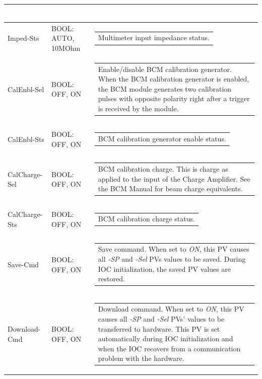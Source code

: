 \documentclass[openany]{article}
\begin{document}
\begin{longtable}{| m{3.0cm} m{4.5cm} m{7.0cm} |}
\begin{tabular}{@{}m{6cm}@{}}
						\end{tabular} \\ \hline
		Imped-Sts & BOOL: AUTO, 10MOhm & \begin{tabular}{@{}m{6cm}@{}}
	    					Multimeter input impedance status.
						\end{tabular} \\ \hline
		CalEnbl-Sel & BOOL: OFF, ON & \begin{tabular}{@{}m{6cm}@{}}
	    					Enable/disable BCM calibration generator. When the BCM calibration generator is enabled, the BCM module generates two calibration pulses with opposite polarity right after a trigger is received by the module.
						\end{tabular} \\ \hline
		CalEnbl-Sts & BOOL: OFF, ON & \begin{tabular}{@{}m{6cm}@{}}
 						BCM calibration generator enable status.
						\end{tabular} \\ \hline
		CalCharge-Sel & BOOL: OFF, ON & \begin{tabular}{@{}m{6cm}@{}}
	    					BCM calibration charge. This is charge as applied to the input of the Charge Amplifier. See the BCM Manual for beam charge equivalents.
						\end{tabular} \\ \hline
		CalCharge-Sts & BOOL: OFF, ON & \begin{tabular}{@{}m{6cm}@{}}
 						BCM calibration charge status.
						\end{tabular} \\ \hline
		Save-Cmd & BOOL: OFF, ON & \begin{tabular}{@{}m{6cm}@{}}
 						Save command. When set to \emph{ON}, this PV causes all \emph{-SP} and \emph{-Sel} PVs values to be saved. During IOC initialization, the saved PV values are restored.
						\end{tabular} \\ \hline
		Download-Cmd & BOOL: OFF, ON & \begin{tabular}{@{}m{6cm}@{}}
 						Download command. When set to \emph{ON}, this PV causes all \emph{-SP} and \emph{-Sel} PVs' values to be transferred to hardware. This PV is set automatically during IOC initialization and when the IOC recovers from a communication problem with the hardware.
						\end{tabular} \\ \hline

	\end{longtable}
\end{document}
